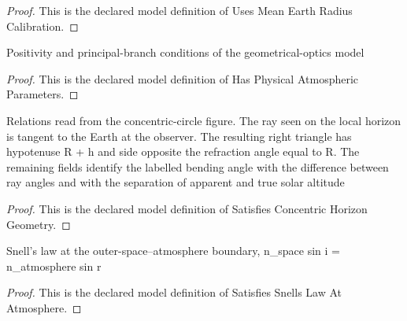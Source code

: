 \begin{proof}
  This is the declared model definition of Uses Mean Earth Radius Calibration.
\end{proof}
\begin{definition}
  \label{def:physics:phyx-mini-0101:phyxminiproblems-problemphyxmini0101-hasphysicalatmosphericparameters}
  Positivity and principal-branch conditions of the geometrical-optics model
\end{definition}
\begin{proof}
  This is the declared model definition of Has Physical Atmospheric Parameters.
\end{proof}
\begin{definition}
  \label{def:physics:phyx-mini-0101:phyxminiproblems-problemphyxmini0101-satisfiesconcentrichorizongeometry}
  Relations read from the concentric-circle figure. The ray seen on the local horizon is tangent to the Earth at the observer. The resulting right triangle has hypotenuse R + h and side opposite the refraction angle equal to R. The remaining fields identify the labelled bending angle with the difference between ray angles and with the separation of apparent and true solar altitude
\end{definition}
\begin{proof}
  This is the declared model definition of Satisfies Concentric Horizon Geometry.
\end{proof}
\begin{definition}
  \label{def:physics:phyx-mini-0101:phyxminiproblems-problemphyxmini0101-satisfiessnellslawatatmosphere}
  Snell's law at the outer-space--atmosphere boundary, n\_space sin i = n\_atmosphere sin r
\end{definition}
\begin{proof}
  This is the declared model definition of Satisfies Snells Law At Atmosphere.
\end{proof}
